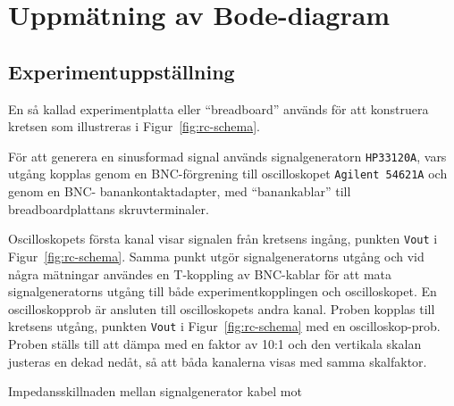 %
%

\section{Uppmätning av Bode-diagram}\label{bode}

\subsection{Experimentuppställning}\label{}
En så kallad experimentplatta eller ``breadboard'' används för att konstruera
kretsen som illustreras i Figur~\ref{fig:rc-schema}.  \par För att generera en
sinusformad signal används signalgeneratorn \texttt{HP33120A}, vars utgång
kopplas genom en BNC-förgrening till oscilloskopet \texttt{Agilent 54621A} och
genom en BNC- banankontaktadapter, med ``banankablar'' till breadboardplattans
skruvterminaler.  \par Oscilloskopets första kanal visar signalen från kretsens
ingång, punkten \texttt{Vout} i Figur~\ref{fig:rc-schema}. Samma punkt utgör
signalgeneratorns utgång och vid några mätningar användes en T-koppling av
BNC-kablar för att mata signalgeneratorns utgång till både experimentkopplingen
och oscilloskopet.  En oscilloskopprob är ansluten till oscilloskopets andra
kanal. Proben kopplas till kretsens utgång, punkten \texttt{Vout} i
Figur~\ref{fig:rc-schema} med en oscilloskop-prob. Proben ställs till att dämpa
med en faktor av 10:1 och den vertikala skalan justeras en dekad nedåt, så att
båda kanalerna visas med samma skalfaktor.
\par Impedansskillnaden mellan signalgenerator kabel mot 


